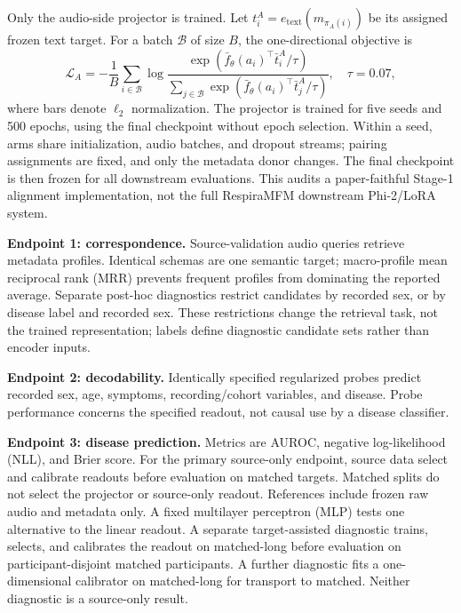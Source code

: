 \documentclass{article}
\begin{document}
Only the audio-side projector is trained. Let
$t_i^A=e_{\mathrm{text}}(m_{\pi_A(i)})$ be its assigned frozen text target.
For a batch $\mathcal B$ of size $B$, the one-directional objective is
\begin{equation}
\mathcal L_A=-\frac{1}{B}\sum_{i\in\mathcal B}
\log\frac{\exp(\bar f_\theta(a_i)^\top\bar t_i^A/\tau)}
{\sum_{j\in\mathcal B}\exp(\bar f_\theta(a_i)^\top\bar t_j^A/\tau)},
\quad \tau=0.07,
\label{eq:loss}
\end{equation}
where bars denote $\ell_2$ normalization. The projector is trained for five
seeds and 500 epochs, using the final checkpoint without epoch selection.
Within a seed, arms share initialization, audio batches, and dropout streams;
pairing assignments are fixed, and only the metadata donor changes. The final
checkpoint is then frozen for all downstream evaluations. This audits a
paper-faithful Stage-1 alignment implementation, not the full RespiraMFM
downstream Phi-2/LoRA system.

\textbf{Endpoint 1: correspondence.} Source-validation audio queries retrieve metadata
profiles. Identical schemas are one semantic target; macro-profile mean
reciprocal rank (MRR) prevents frequent profiles from dominating the reported
average. Separate post-hoc diagnostics restrict candidates by recorded sex,
or by disease label and recorded sex. These restrictions change the retrieval
task, not the trained representation; labels define diagnostic candidate sets
rather than encoder inputs.

\textbf{Endpoint 2: decodability.} Identically specified regularized probes predict
recorded sex, age, symptoms, recording/cohort variables, and disease. Probe
performance concerns the specified readout, not causal use by a disease
classifier.

\textbf{Endpoint 3: disease prediction.} Metrics are AUROC, negative log-likelihood
(NLL), and Brier score. For the primary source-only endpoint, source data
select and calibrate readouts before evaluation on matched targets.
Matched splits do not select the projector or source-only readout.
References include frozen raw audio and metadata only. A fixed multilayer
perceptron (MLP) tests one alternative to the linear readout. A separate
target-assisted diagnostic trains, selects, and calibrates the readout on
matched-long before evaluation on participant-disjoint matched participants.
A further diagnostic fits a one-dimensional calibrator on matched-long for
transport to matched. Neither diagnostic is a source-only result.
\end{document}
